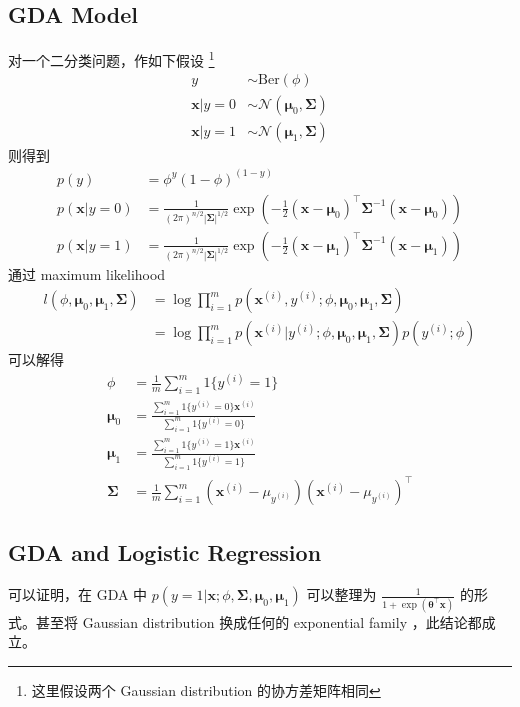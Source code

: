 		\subsection{GDA Model} 
			对一个二分类问题，作如下假设
			\footnote{这里假设两个 Gaussian distribution 的协方差矩阵相同}
			\begin{align*}
				y &\sim \text{Ber}(\phi) \\
				\bm{x} | y=0 &\sim \mathcal{N} (\bm{\mu}_0, \bm{\Sigma}) \\
				\bm{x} | y=1 &\sim \mathcal{N} (\bm{\mu}_1, \bm{\Sigma})
			\end{align*}
			则得到 
			\begin{align*}
				p(y) &= \phi^y (1-\phi)^{(1-y)} \\
				p(\bm{x} | y=0) &= \frac{1}{(2\pi)^{n/2} |\bm{\Sigma}|^{1/2}} \exp \left( -\frac{1}{2} (\bm{x}-\bm{\mu}_0)^\intercal \bm{\Sigma}^{-1} (\bm{x}-\bm{\mu}_0) \right) \\
				p(\bm{x} | y=1) &= \frac{1}{(2\pi)^{n/2} |\bm{\Sigma}|^{1/2}} \exp \left( -\frac{1}{2} (\bm{x}-\bm{\mu}_1)^\intercal \bm{\Sigma}^{-1} (\bm{x}-\bm{\mu}_1) \right)
			\end{align*}
			通过 maximum likelihood 
			\begin{align*}
				l(\phi, \bm{\mu}_0, \bm{\mu}_1, \bm\Sigma) &= \log \prod_{i=1}^{m} p(\bm x^{(i)}, y^{(i)}; \phi, \bm{\mu}_0, \bm{\mu}_1, \bm{\Sigma}) \\
				&= \log \prod_{i=1}^{m} p(\bm x^{(i)} | y^{(i)}; \phi, \bm{\mu}_0, \bm{\mu}_1, \bm{\Sigma}) p(y^{(i)}; \phi)
			\end{align*}
			可以解得 
			\begin{align*}
				\phi &= \frac{1}{m} \sum_{i=1}^{m} 1\{y^{(i)}=1\} \\
				\bm{\mu}_0 &= \frac{ \sum_{i=1}^{m} 1\{y^{(i)}=0\} \bm{x}^{(i)}} { \sum_{i=1}^{m} 1\{y^{(i)}=0\} } \\
				\bm{\mu}_1 &= \frac{ \sum_{i=1}^{m} 1\{y^{(i)}=1\} \bm{x}^{(i)}} { \sum_{i=1}^{m} 1\{y^{(i)}=1\} } \\
				\bm{\Sigma} &= \frac{1}{m} \sum_{i=1}^{m} \left( \bm{x}^{(i)} - \mu_{y^{(i)}} \right) \left( \bm{x}^{(i)} - \mu_{y^{(i)}} \right)^\intercal
			\end{align*}
			
		\subsection{GDA and Logistic Regression}
			可以证明，在 GDA 中 $ p(y=1 | \bm{x}; \phi, \bm{\Sigma}, \bm{\mu}_0, \bm{\mu}_1) $ 可以整理为 $ \frac{1}{1+\exp(\bm{\theta}^\intercal \bm{x})} $ 的形式。甚至将 Gaussian distribution 换成任何的 exponential family ，此结论都成立。
			
